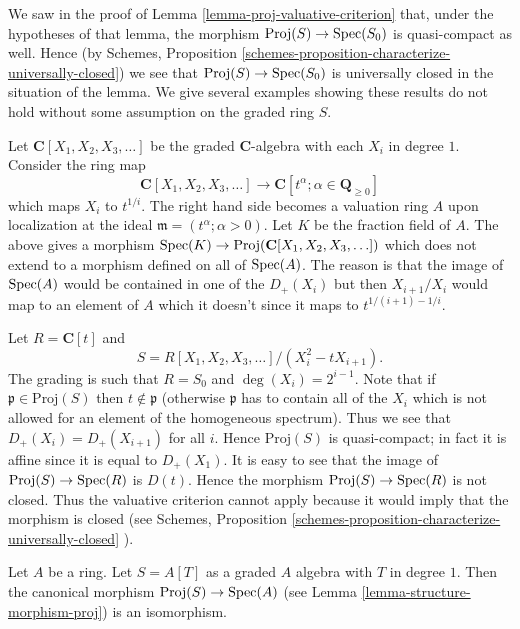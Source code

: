 \noindent
We saw in the proof of Lemma \ref{lemma-proj-valuative-criterion}
that, under the hypotheses of that lemma, the morphism
$\text{Proj}(S) \to \mathop{\mathrm{Spec}}(S_0)$ is quasi-compact as well. Hence (by
Schemes, Proposition \ref{schemes-proposition-characterize-universally-closed})
we see that $\text{Proj}(S) \to \mathop{\mathrm{Spec}}(S_0)$ is universally closed in
the situation of the lemma. We give several examples showing these results
do not hold without some assumption on the graded ring $S$.

\begin{example}
\label{example-not-existence-valuative-big-proj}
Let $\mathbf{C}[X_1, X_2, X_3, \ldots]$ be the graded $\mathbf{C}$-algebra
with each $X_i$ in degree $1$. Consider the ring map
$$
\mathbf{C}[X_1, X_2, X_3, \ldots]
\longrightarrow
\mathbf{C}[t^\alpha ; \alpha \in \mathbf{Q}_{\geq 0}]
$$
which maps $X_i$ to $t^{1/i}$. The right hand side becomes a valuation ring
$A$ upon localization at the ideal $\mathfrak m = (t^\alpha ; \alpha > 0)$.
Let $K$ be the fraction field of $A$. The above gives a morphism
$\mathop{\mathrm{Spec}}(K) \to \text{Proj}(\mathbf{C}[X_1, X_2, X_3, \ldots])$ which does not
extend to a morphism defined on all of $\mathop{\mathrm{Spec}}(A)$.
The reason is that the image of $\mathop{\mathrm{Spec}}(A)$ would be contained
in one of the $D_{+}(X_i)$ but then $X_{i + 1}/X_i$ would map
to an element of $A$ which it doesn't since it maps to
$t^{1/(i + 1) - 1/i}$.
\end{example}

\begin{example}
\label{example-not-existence-valuative-small-proj}
Let $R = \mathbf{C}[t]$ and
$$
S = R[X_1, X_2, X_3, \ldots]/(X_i^2 - tX_{i + 1}).
$$
The grading is such that $R = S_0$ and $\deg(X_i) = 2^{i - 1}$.
Note that if $\mathfrak p \in \text{Proj}(S)$ then
$t \not \in \mathfrak p$ (otherwise $\mathfrak p$ has to contain
all of the $X_i$ which is not allowed for an element of
the homogeneous spectrum). Thus we see that
$D_{+}(X_i) = D_{+}(X_{i + 1})$ for all $i$. Hence
$\text{Proj}(S)$ is quasi-compact; in fact it is affine
since it is equal to $D_{+}(X_1)$. It is easy to see that
the image of $\text{Proj}(S) \to \mathop{\mathrm{Spec}}(R)$ is
$D(t)$. Hence the morphism $\text{Proj}(S) \to \mathop{\mathrm{Spec}}(R)$
is not closed. Thus the valuative criterion cannot apply because
it would imply that the morphism is closed (see
Schemes, Proposition \ref{schemes-proposition-characterize-universally-closed}
).
\end{example}

\begin{example}
\label{example-trivial-proj}
Let $A$ be a ring.
Let $S = A[T]$ as a graded $A$ algebra with $T$ in degree $1$.
Then the canonical morphism $\text{Proj}(S) \to \mathop{\mathrm{Spec}}(A)$
(see Lemma \ref{lemma-structure-morphism-proj})
is an isomorphism.
\end{example}

